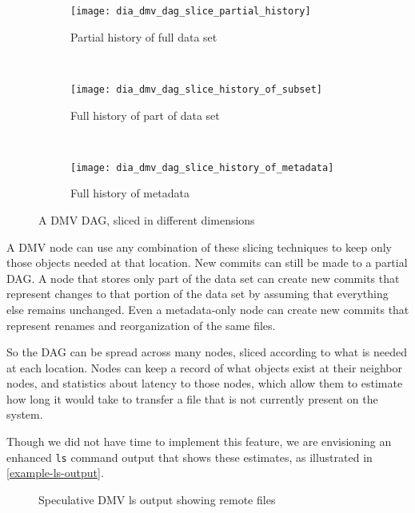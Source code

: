 \newcommand{\slicediagramwidth}{0.45\textwidth}

\begin{figure}

    \centering

    \begin{subfigure}[]{\slicediagramwidth}
        \texttt{[image: dia\_dmv\_dag\_slice\_partial\_history]}
        \caption{Partial history of full data set}
        \label{dia_dmv_dag_slice_partial_history}
    \end{subfigure}
    ~
    \begin{subfigure}[]{\slicediagramwidth}
        \texttt{[image: dia\_dmv\_dag\_slice\_history\_of\_subset]}
        \caption{Full history of part of data set}
        \label{dia_dmv_dag_slice_history_of_subset}
    \end{subfigure}
    ~
    \begin{subfigure}[]{\slicediagramwidth}
        \texttt{[image: dia\_dmv\_dag\_slice\_history\_of\_metadata]}
        \caption{Full history of metadata}
        \label{dia_dmv_dag_slice_history_of_metadata}
    \end{subfigure}

    \caption{A DMV DAG, sliced in different dimensions}
\end{figure}

A \gls{DMV} node can use any combination of these slicing techniques to keep
only those objects needed at that location. New \glspl{commit} can still be made
to a partial \gls{DAG}. A node that stores only part of the data set can create
new \glspl{commit} that represent changes to that portion of the data set by
assuming that everything else remains unchanged. Even a metadata-only node can
create new \glspl{commit} that represent renames and reorganization of the same
files.

So the \gls{DAG} can be spread across many nodes, sliced according to what is
needed at each location. Nodes can keep a record of what objects exist at their
neighbor nodes, and statistics about latency to those nodes, which allow them to
estimate how long it would take to transfer a file that is not currently present
on the system.

Though we did not have time to implement this feature, we are envisioning an
enhanced \lstinline{ls} command output that shows these estimates, as
illustrated in \autoref{example-ls-output}.

\begin{figure}[]
    \caption{Speculative DMV ls output showing remote files}
    \label{example-ls-output}
    
\end{figure}


%
